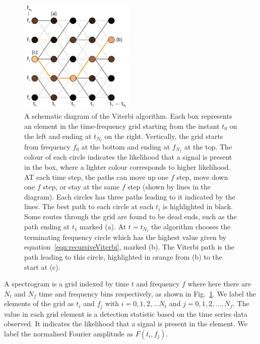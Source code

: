 \documentclass[paper-main.tex]{subfiles}
\begin{document}
\begin{figure}
\includegraphics[width=0.49\textwidth]{figures/viterbiDiagram.pdf}
\caption{\label{fig:viterbi}
A schematic diagram of the Viterbi algorithm. 
Each box represents an element in the time-frequency grid starting from the instant $t_0$ on the left and ending at $t_{N_t}$ on the right. 
Vertically, the grid starts from frequency $f_0$ at the bottom and ending at $f_{N_f}$ at the top. 
The colour of each circle indicates the likelihood that a signal is present in the box, where a lighter colour corresponds to higher likelihood. 
AT each time step, the paths can move up one $f$ step, move down one $f$ step, or stay at the same $f$ step (shown by lines in the diagram). 
Each circles has three paths leading to it indicated by the lines. 
The best path to each circle at each $t_i$ is highlighted in black. 
Some routes through the grid are found to be dead ends, such as the path ending at $t_1$ marked (a). 
At $t=t_{N_t}$ the algorithm chooses the terminating frequency circle which has the highest value given by equation~\ref{eqn:recursiveViterbi}, marked (b). 
The Viterbi path is the path leading to this circle, highlighted in orange from (b) to the start at (c). 
}
\end{figure}

A spectrogram is a grid indexed by time $t$ and frequency $f$ where here there are $N_t$ and $N_f$ time and frequency bins respectively, as shown in Fig.~\ref{fig:viterbi}.
We label the elements of the grid as $t_i$ and $f_j$ with $i=0,1,2,...N_t$ and $j=0,1,2,...,N_f$. 
The value in each grid element is a detection statistic based on the time series data observed. 
It indicates the likelihood that a signal is present in the element. 
We label the normalised Fourier amplitude as $F(t_i,f_j)$. 
\end{document}
